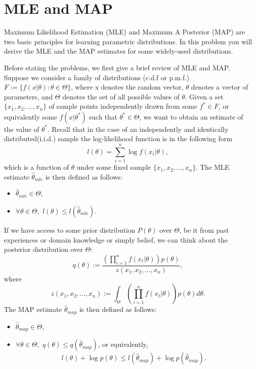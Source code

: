 \documentclass{article}
\theoremstyle{definition}
\theoremstyle{definition}
\theoremstyle{remark}
\begin{document}
\section*{MLE and MAP}

Maximum Likelihood Estimation (MLE) and Maximum A Posterior (MAP) are two basic principles for
learning parametric distributions. In this problem you will derive the MLE and the MAP estimates for some
widely-used distributions.

Before stating the problems, we first give a brief review of MLE and MAP. Suppose we consider a family of
distributions (c.d.f or p.m.f.) $F:=\{f(x|\theta):\theta\in\Theta\}$, where x denotes the random vector, $\theta$
denotes a vector of parameters, and $\Theta$ denotes the set of all possible values of $\theta$. Given a set
$\{x_1,x_2,...,x_n\}$ of sample points independently drawn from some $f^*\in F$, or equivalently some $f(x|\theta^*)$
such that $\theta^*\in \Theta$, we want to obtain an estimate of the value of $\theta^*$. Recall that in the case
of an independently and identically distributed(i.i.d.) sample the log-likelihood function is in the following
form
\[
l(\theta)=\sum_{i=1}^n \log f(x_i|\theta),
\]
which is a function of $\theta$ under some fixed sample $\{x_1,x_2,...,x_n\}$. The MLE estimate $\hat{\theta}_{mle}$ is
then defined as follows:
\begin{itemize}
  \item $\hat{\theta}_{mle}\in\Theta$,
  \item $\forall \theta\in\Theta,$ $l(\theta)\leq l(\hat{\theta}_{mle})$.
\end{itemize}

If we have access to some prior distribution $P(\theta)$ over $\Theta$, be it from past experiences or domain knowledge
or simply belief, we can think about the posterior distribution over $\Theta$:
\[
q(\theta):=\frac{\left(\prod_{i=1}^nf(x_t|\theta)\right)p(\theta)}{z(x_1,x_2,...,x_n)},
\]
where
\[
z(x_1,x_2,...,x_n):=\int_\Theta \left(\prod_{i=1}^nf(x_t|\theta)\right)p(\theta) d\theta.
\]
The MAP estimate $\hat{\theta}_{map}$ is then defined as follows:
\begin{itemize}
  \item $\hat{\theta}_{map}\in \Theta$,
  \item $\forall \theta \in \Theta,$ $q(\theta)\leq q(\hat{\theta}_{map})$, or equivalently,
  \[
  l(\theta)+\log p(\theta) \leq l(\hat{\theta}_{map}) + \log p(\hat{\theta}_{map}).
  \]
\end{itemize}
\end{document}
